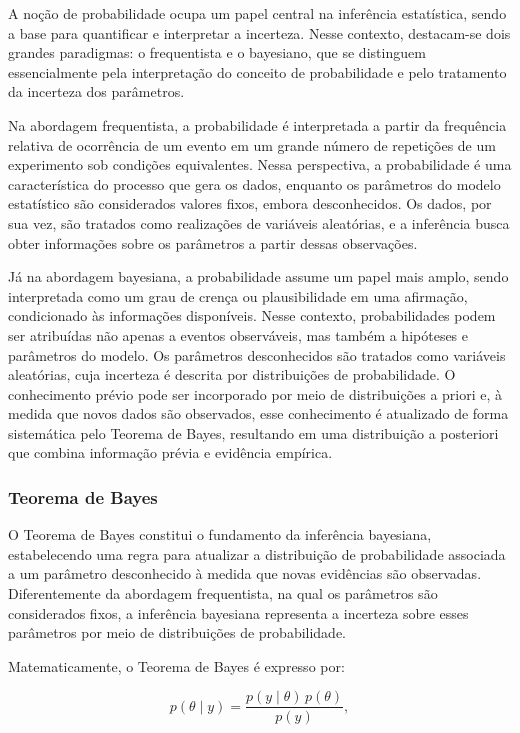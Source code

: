 \documentclass[
  brazilian,
  12pt,
  letterpaper,
  DIV=11,
  numbers=noendperiod]{scrartcl}
\begin{document}
A noção de probabilidade ocupa um papel central na inferência
estatística, sendo a base para quantificar e interpretar a incerteza.
Nesse contexto, destacam-se dois grandes paradigmas: o frequentista e o
bayesiano, que se distinguem essencialmente pela interpretação do
conceito de probabilidade e pelo tratamento da incerteza dos parâmetros.

Na abordagem frequentista, a probabilidade é interpretada a partir da
frequência relativa de ocorrência de um evento em um grande número de
repetições de um experimento sob condições equivalentes. Nessa
perspectiva, a probabilidade é uma característica do processo que gera
os dados, enquanto os parâmetros do modelo estatístico são considerados
valores fixos, embora desconhecidos. Os dados, por sua vez, são tratados
como realizações de variáveis aleatórias, e a inferência busca obter
informações sobre os parâmetros a partir dessas observações.

Já na abordagem bayesiana, a probabilidade assume um papel mais amplo,
sendo interpretada como um grau de crença ou plausibilidade em uma
afirmação, condicionado às informações disponíveis. Nesse contexto,
probabilidades podem ser atribuídas não apenas a eventos observáveis,
mas também a hipóteses e parâmetros do modelo. Os parâmetros
desconhecidos são tratados como variáveis aleatórias, cuja incerteza é
descrita por distribuições de probabilidade. O conhecimento prévio pode
ser incorporado por meio de distribuições a priori e, à medida que novos
dados são observados, esse conhecimento é atualizado de forma
sistemática pelo Teorema de Bayes, resultando em uma distribuição a
posteriori que combina informação prévia e evidência empírica.

\subsubsection{Teorema de Bayes}\label{sec-teorema-bayes}

O Teorema de Bayes constitui o fundamento da inferência bayesiana,
estabelecendo uma regra para atualizar a distribuição de probabilidade
associada a um parâmetro desconhecido à medida que novas evidências são
observadas. Diferentemente da abordagem frequentista, na qual os
parâmetros são considerados fixos, a inferência bayesiana representa a
incerteza sobre esses parâmetros por meio de distribuições de
probabilidade.

Matematicamente, o Teorema de Bayes é expresso por:

\begin{equation}
p(\theta \mid y) =
\frac{p(y \mid \theta)\,p(\theta)}
{p(y)},
\label{eq:bayes}
\end{equation}
\end{document}
